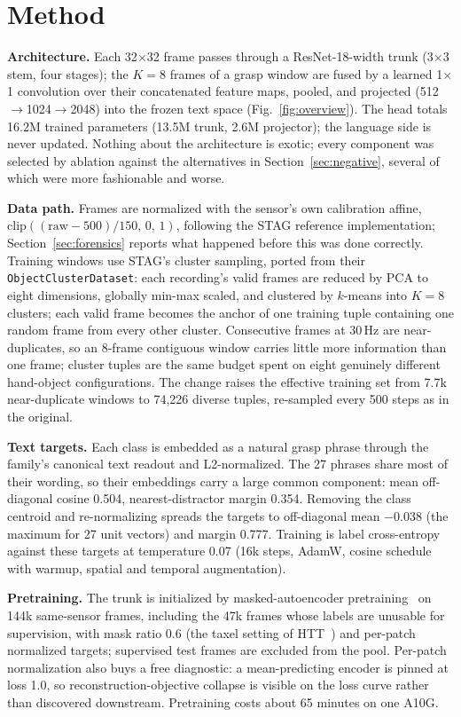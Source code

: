 \documentclass[conference]{IEEEtran}
\begin{document}
\section{Method}
\textbf{Architecture.} Each 32$\times$32 frame passes through a ResNet-18-width trunk
(3$\times$3 stem, four stages); the $K{=}8$ frames of a grasp window are fused by a learned
1$\times$1 convolution over their concatenated feature maps, pooled, and projected
(512$\rightarrow$1024$\rightarrow$2048) into the frozen text space
(Fig.~\ref{fig:overview}). The head totals 16.2M trained parameters (13.5M trunk, 2.6M projector); the language side is
never updated. Nothing about the architecture is exotic; every component was selected by
ablation against the alternatives in Section~\ref{sec:negative}, several of which were
more fashionable and worse.

\textbf{Data path.} Frames are normalized with the sensor's own calibration affine,
$\mathrm{clip}((\mathrm{raw}-500)/150,\,0,\,1)$, following the STAG reference
implementation; Section~\ref{sec:forensics} reports what happened before this was done
correctly. Training windows use STAG's cluster sampling, ported from their
\texttt{ObjectClusterDataset}: each recording's valid frames are reduced by PCA to eight
dimensions, globally min-max scaled, and clustered by $k$-means into $K{=}8$ clusters; each
valid frame becomes the anchor of one training tuple containing one random frame from every
other cluster. Consecutive frames at 30\,Hz are near-duplicates, so an 8-frame contiguous
window carries little more information than one frame; cluster tuples are the same budget
spent on eight genuinely different hand-object configurations. The change raises the
effective training set from 7.7k near-duplicate windows to 74{,}226 diverse tuples,
re-sampled every 500 steps as in the original.

\textbf{Text targets.} Each class is embedded as a natural grasp phrase through the
family's canonical text readout and L2-normalized. The 27 phrases share most of their
wording, so their embeddings carry a large common component: mean off-diagonal cosine
0.504, nearest-distractor margin 0.354. Removing the class centroid and re-normalizing
spreads the targets to off-diagonal mean $-0.038$ (the maximum for 27 unit vectors) and
margin 0.777. Training is label cross-entropy against these targets at temperature 0.07
(16k steps, AdamW, cosine schedule with warmup, spatial and temporal augmentation).

\textbf{Pretraining.} The trunk is initialized by masked-autoencoder
pretraining~\cite{he2022mae} on 144k same-sensor frames, including the 47k frames whose
labels are unusable for supervision, with mask ratio 0.6 (the taxel setting of
HTT~\cite{bi2026htt}) and per-patch normalized targets; supervised test frames are excluded
from the pool. Per-patch normalization also buys a free diagnostic: a mean-predicting
encoder is pinned at loss 1.0, so reconstruction-objective collapse is visible on the loss
curve rather than discovered downstream. Pretraining costs about 65 minutes on one A10G.
\end{document}
